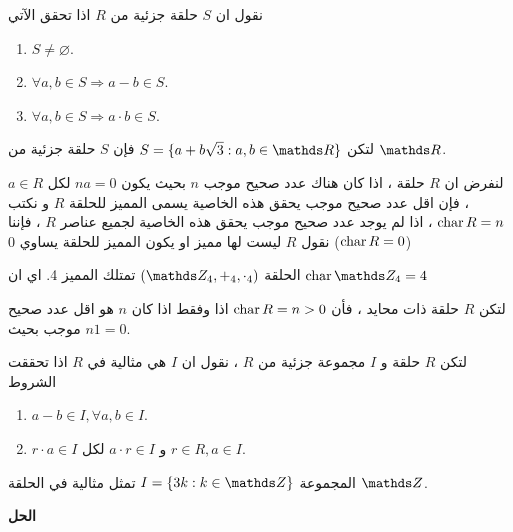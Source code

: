  \begin{note}
 	نقول ان $S$ حلقة جزئية من $R$ اذا تحقق الآتي
 	\begin{enumerate}[label=$\boxed{\arabic*}$]
 		\item $S\neq \varnothing$.
 		\item $\forall a,b\in S \Rightarrow a-b\in S$.
 		\item $\forall a,b\in S\Rightarrow a\cdot b\in S$.
 	\end{enumerate}
 \end{note}
 
 \begin{example}
 	لتكن $S = \{a+b\sqrt{3} : a, b\in \R \}$ فإن $S$ حلقة جزئية من $\R$.
 \end{example}
 
 \begin{definition}
 	لنفرض ان $R$ حلقة ، اذا كان هناك عدد صحيح موجب $n$ بحيث يكون $na=0$ لكل $a\in R$ ، فإن اقل عدد صحيح موجب يحقق هذه الخاصية يسمى المميز للحلقة $R$ و نكتب $\operatorname{char} R = n$ ، اذا لم يوجد عدد صحيح موجب يحقق هذه الخاصية لجميع عناصر $R$ ، فإننا نقول $R$ ليست لها مميز او يكون المميز للحلقة يساوي 0 ($\operatorname{char} R=0$)
 \end{definition}
 
 \begin{example}
 	الحلقة 
 	$(\Z_4, +_4, \cdot_4) $ تمتلك المميز 4. اي ان $\Char \Z_4=4$
 \end{example}
 
 \begin{theorem}
 	لتكن $R$ حلقة ذات محايد ، فأن $\operatorname{char} R=n >0$ اذا وفقط اذا كان $n$ هو اقل عدد صحيح موجب بحيث $n1=0$.
 \end{theorem}
 
 
 \begin{definition}
 	لتكن $R$ حلقة و $I$ مجموعة جزئية من $R$ ، نقول ان $I$ هي مثالية في $R$ اذا تحققت الشروط
 	\begin{enumerate}[label=$\boxed{\arabic*}$]
 		\item $a-b\in I, \forall a, b\in I$.
 		\item $r\cdot a \in I$ و $a\cdot r\in I$ لكل $r\in R, a\in I$.
 	\end{enumerate}
 \end{definition}
 
 \begin{example}
 	المجموعة 
 	$I = \{3k : k\in \Z\}$ تمثل مثالية في الحلقة $\Z$.
 \end{example}
 \noindent
 \textbf{الحل}
 
